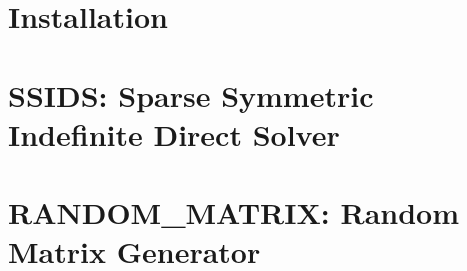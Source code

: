\documentclass{spralweb}
\begin{document}
\chapter{Installation}

\chapter{SSIDS: Sparse Symmetric Indefinite Direct Solver}

\chapter{RANDOM\_MATRIX: Random Matrix Generator}

\end{document}
